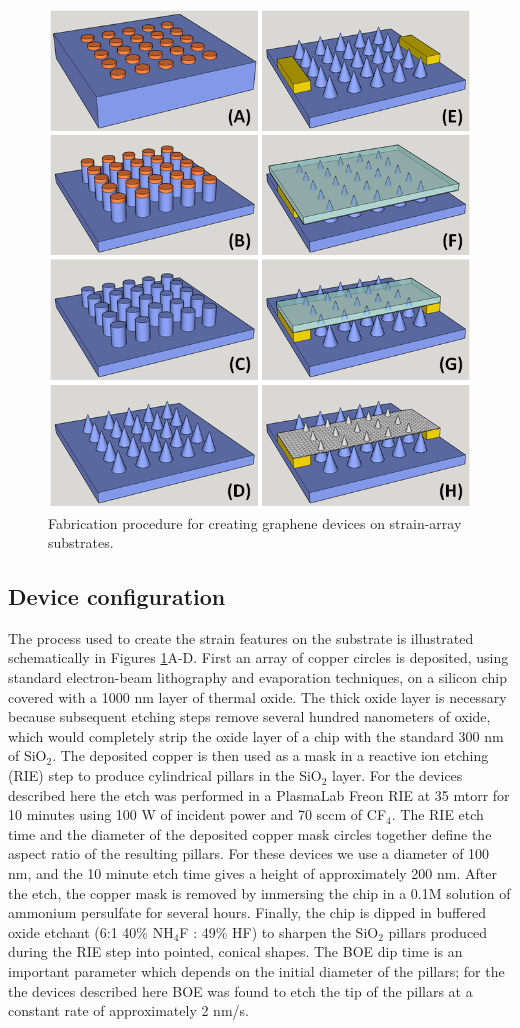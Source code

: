 \documentclass[edeposit,fullpage,draftthesis]{uiucthesis2009}
\begin{document}
            \begin{figure}
            \centering
            \includegraphics[width=0.5\columnwidth]{images/resultsanddiscussion/strainarraypaper/Figure1}
            \caption{Fabrication procedure for creating graphene devices on strain-array substrates.}
            \label{'fig:fab'}
            \end{figure}
            
    \subsection{Device configuration}
            
           
          
           
            The process used to create the strain features on the substrate is illustrated schematically in Figures \ref{'fig:fab'}A-D.
            First an array of copper circles is deposited, using standard electron-beam lithography and evaporation techniques, 
            on a silicon chip covered with a 1000 nm layer of thermal oxide. 
            The thick oxide layer is necessary because subsequent etching steps remove several hundred nanometers of oxide, 
            which would completely strip the oxide layer of a chip with the standard 300 nm of SiO$_2$.
            The deposited copper is then used as a mask in a reactive ion etching 
            (RIE) step to produce cylindrical pillars in the SiO$_2$ layer. For the devices described here the etch was performed in 
            a PlasmaLab Freon RIE at 35 mtorr for 10 minutes 
            using 100 W of incident power and 70 sccm of CF$_4$. 
            The RIE etch time and the diameter of the deposited copper mask circles together define the aspect ratio of the resulting 
            pillars. For these devices we use a diameter of 100 nm, and the 10 minute etch time gives a height of approximately  
            200 nm.
            After the etch, the copper mask is removed by immersing the chip 
            in a 0.1M solution of ammonium persulfate for several hours. Finally, the chip is dipped in buffered oxide etchant 
            (6:1 40\% NH$_4$F : 49\% HF) to sharpen the SiO$_2$ pillars produced during the RIE step into pointed, conical shapes. 
            The BOE dip time is an important parameter which depends on the initial diameter of the pillars; for the the devices
            described here BOE was found to etch the tip of the pillars at a constant rate of approximately 2 nm/s. 
            
\end{document}
